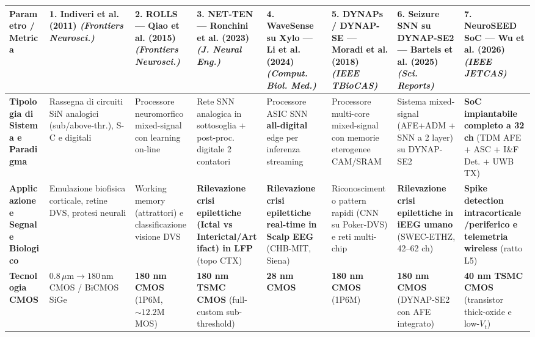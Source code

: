 \documentclass[11pt,a4paper]{article}
\begin{document}
\begin{center}
\scriptsize
\renewcommand{\arraystretch}{1.3}
\begin{tabularx}{\textwidth}{|>{\raggedright\arraybackslash}X|>{\raggedright\arraybackslash}X|>{\raggedright\arraybackslash}X|>{\raggedright\arraybackslash}X|>{\raggedright\arraybackslash}X|>{\raggedright\arraybackslash}X|>{\raggedright\arraybackslash}X|>{\raggedright\arraybackslash}X|}
\hline
\textbf{Parametro / Metrica} & \textbf{\textbf{1. Indiveri et al. (2011)} \textit{(Frontiers Neurosci.)}} & \textbf{\textbf{2. ROLLS --- Qiao et al. (2015)} \textit{(Frontiers Neurosci.)}} & \textbf{\textbf{3. NET-TEN --- Ronchini et al. (2023)} \textit{(J. Neural Eng.)}} & \textbf{\textbf{4. WaveSense su Xylo --- Li et al. (2024)} \textit{(Comput. Biol. Med.)}} & \textbf{\textbf{5. DYNAPs / DYNAP-SE --- Moradi et al. (2018)} \textit{(IEEE TBioCAS)}} & \textbf{\textbf{6. Seizure SNN su DYNAP-SE2 --- Bartels et al. (2025)} \textit{(Sci. Reports)}} & \textbf{\textbf{7. NeuroSEED SoC --- Wu et al. (2026)} \textit{(IEEE JETCAS)}} \\ \hline \hline
\textbf{Tipologia di Sistema e Paradigma} & Rassegna di circuiti SiN analogici (sub/above-thr.), S-C e digitali & Processore neuromorfico mixed-signal con learning on-line & Rete SNN analogica in sottosoglia + post-proc. digitale 2 contatori & Processore ASIC SNN \textbf{all-digital} edge per inferenza streaming & Processore multi-core mixed-signal con memorie eterogenee CAM/SRAM & Sistema mixed-signal (AFE+ADM + SNN a 2 layer) su DYNAP-SE2 & \textbf{SoC impiantabile completo a 32 ch} (TDM AFE + ASC + I\&F Det. + UWB TX) \\ \hline
\textbf{Applicazione e Segnale Biologico} & Emulazione biofisica corticale, retine DVS, protesi neurali & Working memory (attrattori) e classificazione visione DVS & \textbf{Rilevazione crisi epilettiche (Ictal vs Interictal/Artifact) in LFP} (topo CTX) & \textbf{Rilevazione crisi epilettiche real-time in Scalp EEG} (CHB-MIT, Siena) & Riconoscimento pattern rapidi (CNN su Poker-DVS) e reti multi-chip & \textbf{Rilevazione crisi epilettiche in iEEG umano} (SWEC-ETHZ, 42--62 ch) & \textbf{Spike detection intracorticale/periferico e telemetria wireless} (ratto L5) \\ \hline
\textbf{Tecnologia CMOS} & $0.8\,\mu\text{m} \to 180\,\text{nm}$ CMOS / BiCMOS SiGe & \textbf{180 nm CMOS} (1P6M, $\sim 12.2\text{M}$ MOS) & \textbf{180 nm TSMC CMOS} (full-custom sub-threshold) & \textbf{28 nm CMOS} & \textbf{180 nm CMOS} (1P6M) & \textbf{180 nm CMOS} (DYNAP-SE2 con AFE integrato) & \textbf{40 nm TSMC CMOS} (transistor thick-oxide e low-$V_t$) \\ \hline

\end{tabularx}
\end{center}
\end{document}
